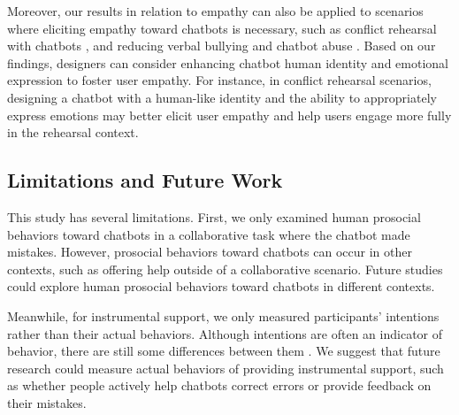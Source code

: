 Moreover, our results in relation to empathy can also be applied to scenarios where eliciting empathy toward chatbots is necessary, such as conflict rehearsal with chatbots \cite{shaikh2024rehearsal}, and reducing verbal bullying and chatbot abuse \cite{keijsers2021s}. Based on our findings, designers can consider enhancing chatbot human identity and emotional expression to foster user empathy. For instance, in conflict rehearsal scenarios, designing a chatbot with a human-like identity and the ability to appropriately express emotions may better elicit user empathy and help users engage more fully in the rehearsal context. 



\subsection{Limitations and Future Work}
This study has several limitations. First, we only examined human prosocial behaviors toward chatbots in a collaborative task where the chatbot made mistakes. However, prosocial behaviors toward chatbots can occur in other contexts, such as offering help outside of a collaborative scenario. Future studies could explore human prosocial behaviors toward chatbots in different contexts.

Meanwhile, for instrumental support, we only measured participants’ intentions rather than their actual behaviors. Although intentions are often an indicator of behavior, there are still some differences between them \cite{webb2006does}. We suggest that future research could measure actual behaviors of providing instrumental support, such as whether people actively help chatbots correct errors or provide feedback on their mistakes.

